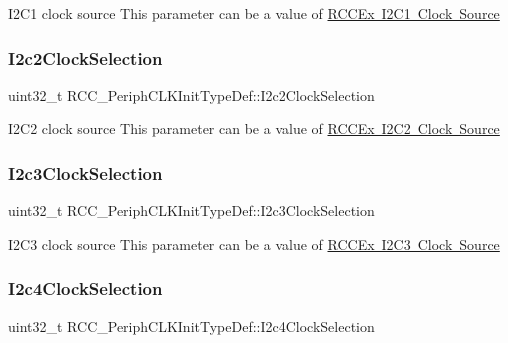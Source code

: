 I2\+C1 clock source This parameter can be a value of \mbox{\hyperlink{group___r_c_c_ex___i2_c1___clock___source}{R\+C\+C\+Ex I2\+C1 Clock Source}} \mbox{\label{struct_r_c_c___periph_c_l_k_init_type_def_a08536f08136780e6566a68f1e33be4fb}} 
\subsubsection{\texorpdfstring{I2c2ClockSelection}{I2c2ClockSelection}}
{\footnotesize\ttfamily uint32\+\_\+t R\+C\+C\+\_\+\+Periph\+C\+L\+K\+Init\+Type\+Def\+::\+I2c2\+Clock\+Selection}

I2\+C2 clock source This parameter can be a value of \mbox{\hyperlink{group___r_c_c_ex___i2_c2___clock___source}{R\+C\+C\+Ex I2\+C2 Clock Source}} \mbox{\label{struct_r_c_c___periph_c_l_k_init_type_def_a8497daa4d66fdc5f0033e798559f65a2}} 
\subsubsection{\texorpdfstring{I2c3ClockSelection}{I2c3ClockSelection}}
{\footnotesize\ttfamily uint32\+\_\+t R\+C\+C\+\_\+\+Periph\+C\+L\+K\+Init\+Type\+Def\+::\+I2c3\+Clock\+Selection}

I2\+C3 clock source This parameter can be a value of \mbox{\hyperlink{group___r_c_c_ex___i2_c3___clock___source}{R\+C\+C\+Ex I2\+C3 Clock Source}} \mbox{\label{struct_r_c_c___periph_c_l_k_init_type_def_a4c4c2ad7382843b24eda31f0d8b4bcf6}} 
\subsubsection{\texorpdfstring{I2c4ClockSelection}{I2c4ClockSelection}}
{\footnotesize\ttfamily uint32\+\_\+t R\+C\+C\+\_\+\+Periph\+C\+L\+K\+Init\+Type\+Def\+::\+I2c4\+Clock\+Selection}


